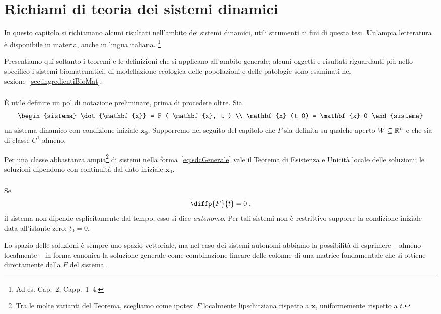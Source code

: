 \chapter{Richiami di teoria dei sistemi dinamici}
\label{chap:teoria}
In questo capitolo si richiamano alcuni risultati nell'ambito dei sistemi dinamici, utili strumenti ai fini
di questa tesi.
Un'ampia letteratura è disponibile in materia, anche in lingua italiana.
\footnote{Ad es. \cite{ricciSistDin} Cap.~2, \cite{introSD} Capp.~1--4.}

Presentiamo qui soltanto i teoremi e le definizioni che si applicano all'ambito generale; alcuni oggetti
e risultati riguardanti più nello specifico i sistemi biomatematici, di modellazione ecologica delle popolazioni
e delle patologie sono esaminati nel sezione~\ref{sec:ingredientiBioMat}.

\paragraph{}
È utile definire un po' di notazione preliminare, prima di procedere oltre.
Sia
\begin{equation}
\begin{sistema}
\dot{\mathbf{x}} = F ( \mathbf{x}, t ) \\
\mathbf{x} (t_0) = \mathbf{x}_0
\end{sistema}
\label{eq:sdcGenerale}
\end{equation}
un sistema dinamico con condizione iniziale $\mathbf{x}_0$. Supporremo nel seguito del capitolo che $F$ sia
definita su qualche aperto $W \subseteq \mathbb{R}^n$ e che sia di classe $C^1$ almeno.

Per una classe abbastanza ampia\footnote{Tra le molte varianti del Teorema, scegliamo come ipotesi $F$
localmente lipschitziana rispetto a $\mathbf{x}$, uniformemente rispetto a $t$.}
di sistemi nella forma~\eqref{eq:sdcGenerale} vale il Teorema di Esistenza e Unicità locale delle soluzioni;
le soluzioni dipendono con continuità dal dato iniziale $\mathbf{x}_0$.

\paragraph{}
Se
$$\diffp{F}{t} = 0 \; ,$$
\ie il sistema non dipende esplicitamente dal tempo, esso si dice \emph{autonomo}.
Per tali sistemi non è restrittivo supporre la condizione iniziale data all'istante zero: $t_0=0$.

Lo spazio delle soluzioni è sempre uno spazio vettoriale, ma nel caso dei sistemi autonomi abbiamo
la possibilità di esprimere -- almeno localmente -- in forma canonica la soluzione generale come
combinazione lineare delle colonne di una matrice fondamentale che si ottiene direttamente
dalla $F$ del sistema.

